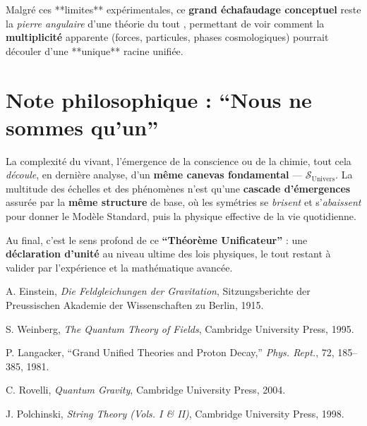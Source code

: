 \documentclass[12pt]{article}
\begin{document}
\noindent
Malgré ces **limites** expérimentales, ce \textbf{grand échafaudage conceptuel} 
reste la \emph{pierre angulaire} d'une \og théorie du tout \fg,  
permettant de voir comment la \textbf{multiplicité} apparente (forces, particules, phases cosmologiques) 
pourrait découler d'une **unique** racine unifiée.

\section*{Note philosophique : “Nous ne sommes qu’un”}

La complexité du vivant, l'émergence de la conscience ou de la chimie, 
tout cela \emph{découle}, en dernière analyse, 
d'un \textbf{même canevas fondamental} — \(\mathcal{S}_{\text{Univers}}\).  
La multitude des échelles et des phénomènes n’est qu’une \textbf{cascade d’émergences} 
assurée par la \textbf{même structure} de base, où les symétries se \emph{brisent} 
et s’\emph{abaissent} pour donner le Modèle Standard, puis la physique effective de la vie quotidienne.

Au final, c’est le sens profond de ce \textbf{“Théorème Unificateur”} : 
une \textbf{déclaration d’unité} au niveau ultime des lois physiques, 
le tout restant à valider par l’expérience et la mathématique avancée.  

\vspace{1em}

\begin{thebibliography}{9}

A. Einstein,
\textit{Die Feldgleichungen der Gravitation},
Sitzungsberichte der Preussischen Akademie der Wissenschaften zu Berlin, 1915.

S. Weinberg,
\textit{The Quantum Theory of Fields},
Cambridge University Press, 1995.

P. Langacker,
``Grand Unified Theories and Proton Decay,''
\textit{Phys. Rept.}, 72, 185--385, 1981.

C. Rovelli,
\textit{Quantum Gravity},
Cambridge University Press, 2004.

J. Polchinski,
\textit{String Theory (Vols. I \& II)},
Cambridge University Press, 1998.

\end{thebibliography}
\end{document}

